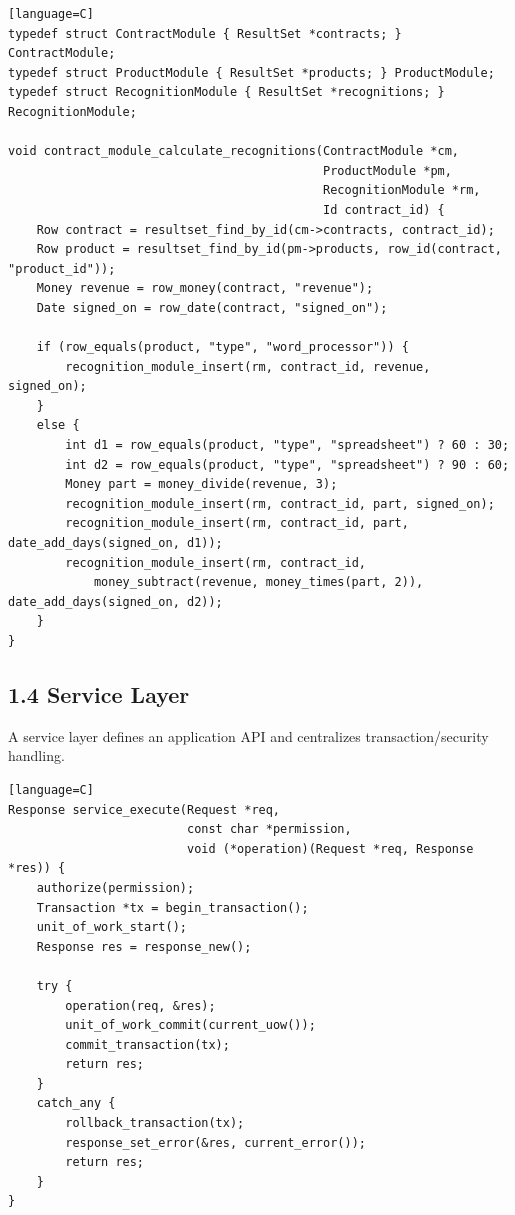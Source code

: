 \documentclass[11pt]{article}
\begin{document}
\begin{verbatim}[language=C]
typedef struct ContractModule { ResultSet *contracts; } ContractModule;
typedef struct ProductModule { ResultSet *products; } ProductModule;
typedef struct RecognitionModule { ResultSet *recognitions; } RecognitionModule;

void contract_module_calculate_recognitions(ContractModule *cm,
                                            ProductModule *pm,
                                            RecognitionModule *rm,
                                            Id contract_id) {
    Row contract = resultset_find_by_id(cm->contracts, contract_id);
    Row product = resultset_find_by_id(pm->products, row_id(contract, "product_id"));
    Money revenue = row_money(contract, "revenue");
    Date signed_on = row_date(contract, "signed_on");

    if (row_equals(product, "type", "word_processor")) {
        recognition_module_insert(rm, contract_id, revenue, signed_on);
    }
    else {
        int d1 = row_equals(product, "type", "spreadsheet") ? 60 : 30;
        int d2 = row_equals(product, "type", "spreadsheet") ? 90 : 60;
        Money part = money_divide(revenue, 3);
        recognition_module_insert(rm, contract_id, part, signed_on);
        recognition_module_insert(rm, contract_id, part, date_add_days(signed_on, d1));
        recognition_module_insert(rm, contract_id,
            money_subtract(revenue, money_times(part, 2)), date_add_days(signed_on, d2));
    }
}
\end{verbatim}

\subsection{1.4 Service Layer}\label{service-layer}

A service layer defines an application API and centralizes
transaction/security handling.

\begin{verbatim}[language=C]
Response service_execute(Request *req,
                         const char *permission,
                         void (*operation)(Request *req, Response *res)) {
    authorize(permission);
    Transaction *tx = begin_transaction();
    unit_of_work_start();
    Response res = response_new();

    try {
        operation(req, &res);
        unit_of_work_commit(current_uow());
        commit_transaction(tx);
        return res;
    }
    catch_any {
        rollback_transaction(tx);
        response_set_error(&res, current_error());
        return res;
    }
}
\end{verbatim}
\end{document}
